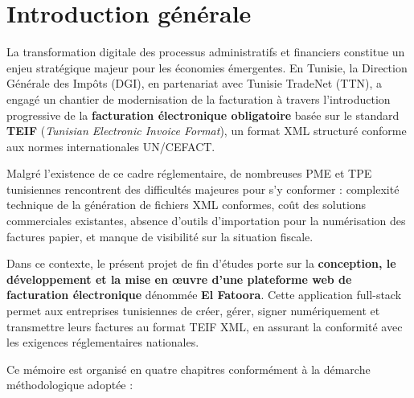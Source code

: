 \documentclass[a4paper,12pt]{report}
\newcommand{\elfattoora}{\textbf{El Fatoora}}
\newcommand{\teif}{\textbf{TEIF}}
\begin{document}
\tableofcontents
\newpage
\listoffigures
\newpage
\listoftables
\newpage
{}


\chapter*{Introduction générale}

La transformation digitale des processus administratifs et financiers constitue un enjeu stratégique majeur pour les économies émergentes. En Tunisie, la Direction Générale des Impôts (DGI), en partenariat avec Tunisie TradeNet (TTN), a engagé un chantier de modernisation de la facturation à travers l'introduction progressive de la \textbf{facturation électronique obligatoire} basée sur le standard \teif{} (\textit{Tunisian Electronic Invoice Format}), un format XML structuré conforme aux normes internationales UN/CEFACT.

Malgré l'existence de ce cadre réglementaire, de nombreuses PME et TPE tunisiennes rencontrent des difficultés majeures pour s'y conformer : complexité technique de la génération de fichiers XML conformes, coût des solutions commerciales existantes, absence d'outils d'importation pour la numérisation des factures papier, et manque de visibilité sur la situation fiscale.

Dans ce contexte, le présent projet de fin d'études porte sur la \textbf{conception, le développement et la mise en \oe{}uvre d'une plateforme web de facturation électronique} dénommée \elfattoora{}. Cette application full-stack permet aux entreprises tunisiennes de créer, gérer, signer numériquement et transmettre leurs factures au format TEIF XML, en assurant la conformité avec les exigences réglementaires nationales.

Ce mémoire est organisé en quatre chapitres conformément à la démarche méthodologique adoptée :
\end{document}
